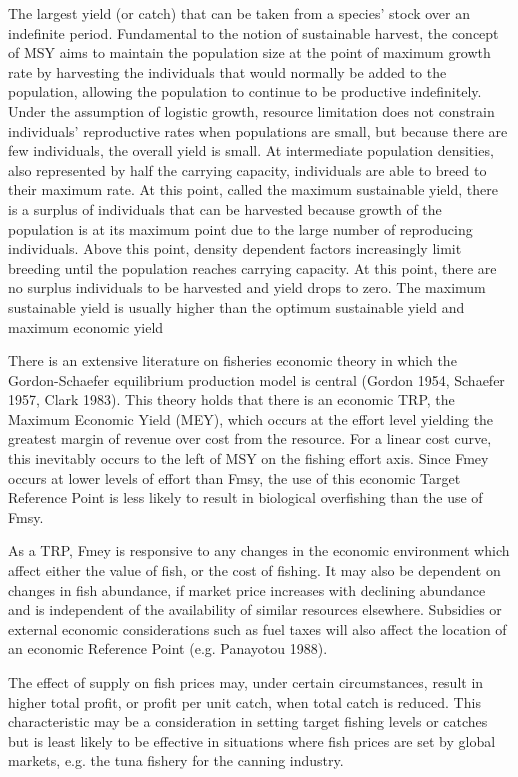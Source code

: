 \documentclass[12pt,oneline,a4paper,numbib]{ouparticle}
\begin{document}
The largest yield (or catch) that can be taken from a species' stock over an indefinite period. Fundamental to the notion of sustainable harvest, the concept of MSY aims to maintain the population size at the point of maximum growth rate by harvesting the individuals that would normally be added to the population, allowing the population to continue to be productive indefinitely. Under the assumption of logistic growth, resource limitation does not constrain individuals’ reproductive rates when populations are small, but because there are few individuals, the overall yield is small. At intermediate population densities, also represented by half the carrying capacity, individuals are able to breed to their maximum rate. At this point, called the maximum sustainable yield, there is a surplus of individuals that can be harvested because growth of the population is at its maximum point due to the large number of reproducing individuals. Above this point, density dependent factors increasingly limit breeding until the population reaches carrying capacity. At this point, there are no surplus individuals to be harvested and yield drops to zero. The maximum sustainable yield is usually higher than the optimum sustainable yield and maximum economic yield

There is an extensive literature on fisheries economic theory in which the Gordon-Schaefer equilibrium production model is central (Gordon 1954, Schaefer 1957, Clark 1983). This theory holds that there is an economic TRP, the Maximum Economic Yield (MEY), which occurs at the effort level yielding the greatest margin of revenue over cost from the resource. 
For a linear cost curve, this inevitably occurs to the left of MSY on the fishing effort axis. Since Fmey occurs at lower levels of effort than Fmsy, the use of this economic Target Reference Point is less likely to result in biological overfishing than the use of Fmsy.

As a TRP, Fmey is responsive to any changes in the economic environment which affect either the value of fish, or the cost of fishing. It may also be dependent on changes in fish abundance, if market price increases with declining abundance and is independent of the availability of similar resources elsewhere. Subsidies or external economic considerations such as fuel taxes will also affect the location of an economic Reference Point (e.g. Panayotou 1988).

The effect of supply on fish prices may, under certain circumstances, result in higher total profit, or profit per unit catch, when total catch is reduced. This characteristic may be a consideration in setting target fishing levels or catches but is least likely to be effective in situations where fish prices are set by global markets, e.g. the tuna fishery for the canning industry.
\end{document}

